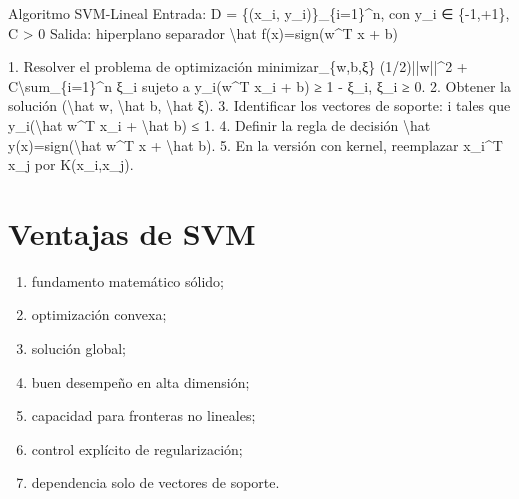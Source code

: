 \documentclass[
  spanish,
  10.5pt,
  letterpaper,
  DIV=11,
  numbers=noendperiod,
  oneside,
  open=any]{scrreprt}
\newenvironment{Shaded}{\begin{snugshade}}{\end{snugshade}}
\newcommand{\NormalTok}[1]{\textcolor[rgb]{0.00,0.23,0.31}{#1}}
\providecommand{\tightlist}{%
  \setlength{\itemsep}{0pt}\setlength{\parskip}{0pt}}
\theoremstyle{definition}
\theoremstyle{definition}
\theoremstyle{plain}
\theoremstyle{remark}
\begin{document}
\begin{tcolorbox}[enhanced jigsaw, arc=.35mm, bottomrule=.15mm, bottomtitle=1mm, breakable, colback=white, colbacktitle=quarto-callout-note-color!10!white, colframe=quarto-callout-note-color-frame, coltitle=black, left=2mm, leftrule=.75mm, opacityback=0, opacitybacktitle=0.6, rightrule=.15mm, title=\textcolor{quarto-callout-note-color}{\faInfo}\hspace{0.5em}{Seudocódigo matemático formal}, titlerule=0mm, toprule=.15mm, toptitle=1mm]

\begin{Shaded}
\begin{Highlighting}[numbers=left,,]
\NormalTok{Algoritmo SVM{-}Lineal}
\NormalTok{Entrada:}
\NormalTok{  D = \{(x\_i, y\_i)\}\_\{i=1\}\^{}n, con y\_i ∈ \{{-}1,+1\}, C \textgreater{} 0}
\NormalTok{Salida:}
\NormalTok{  hiperplano separador \textbackslash{}hat f(x)=sign(w\^{}T x + b)}

\NormalTok{1. Resolver el problema de optimización}
\NormalTok{      minimizar\_\{w,b,ξ\}   (1/2)||w||\^{}2 + C\textbackslash{}sum\_\{i=1\}\^{}n ξ\_i}
\NormalTok{      sujeto a            y\_i(w\^{}T x\_i + b) ≥ 1 {-} ξ\_i,}
\NormalTok{                          ξ\_i ≥ 0.}
\NormalTok{2. Obtener la solución (\textbackslash{}hat w, \textbackslash{}hat b, \textbackslash{}hat ξ).}
\NormalTok{3. Identificar los vectores de soporte:}
\NormalTok{      i tales que y\_i(\textbackslash{}hat w\^{}T x\_i + \textbackslash{}hat b) ≤ 1.}
\NormalTok{4. Definir la regla de decisión}
\NormalTok{      \textbackslash{}hat y(x)=sign(\textbackslash{}hat w\^{}T x + \textbackslash{}hat b).}
\NormalTok{5. En la versión con kernel, reemplazar x\_i\^{}T x\_j por K(x\_i,x\_j).}
\end{Highlighting}
\end{Shaded}

\end{tcolorbox}

\section*{Ventajas de SVM}\label{ventajas-de-svm}


\begin{enumerate}
\def\labelenumi{\arabic{enumi}.}
\tightlist
\item
  fundamento matemático sólido;
\item
  optimización convexa;
\item
  solución global;
\item
  buen desempeño en alta dimensión;
\item
  capacidad para fronteras no lineales;
\item
  control explícito de regularización;
\item
  dependencia solo de vectores de soporte.
\end{enumerate}
\end{document}
